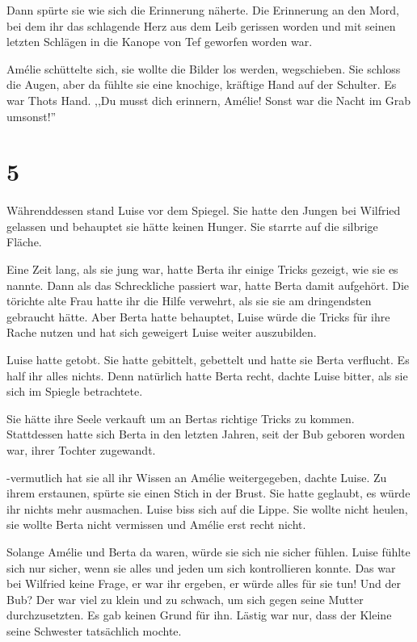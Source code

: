Dann spürte sie wie sich die Erinnerung näherte. Die Erinnerung an den Mord, bei dem ihr das schlagende Herz aus dem Leib gerissen worden und mit seinen letzten Schlägen in die Kanope von Tef geworfen worden war.

Amélie schüttelte sich, sie wollte die Bilder los werden, wegschieben. Sie schloss die Augen, aber da fühlte sie eine knochige, kräftige Hand auf der Schulter. Es war Thots Hand. ,,Du musst dich erinnern, Amélie! Sonst war die Nacht im Grab umsonst!''

\section*{5}

Währenddessen stand Luise vor dem Spiegel. Sie hatte den Jungen bei Wilfried gelassen und behauptet sie hätte keinen Hunger. Sie starrte auf die silbrige Fläche.

Eine Zeit lang, als sie jung war, hatte Berta ihr einige Tricks gezeigt, wie sie es nannte. Dann als das Schreckliche passiert war, hatte Berta damit aufgehört. Die törichte alte Frau hatte ihr die Hilfe verwehrt, als sie sie am dringendsten gebraucht hätte. Aber Berta hatte behauptet, Luise würde die Tricks für ihre Rache nutzen und hat sich geweigert Luise weiter auszubilden.

Luise hatte getobt. Sie hatte gebittelt, gebettelt und hatte sie Berta verflucht. Es half ihr alles nichts. Denn natürlich hatte Berta recht, dachte Luise bitter, als sie sich im Spiegle betrachtete.

Sie hätte ihre Seele verkauft um an Bertas richtige Tricks zu kommen. Stattdessen hatte sich Berta in den letzten Jahren, seit der Bub geboren worden war, ihrer Tochter zugewandt. 

-vermutlich hat sie all ihr Wissen an Amélie weitergegeben, dachte Luise. Zu ihrem erstaunen, spürte sie einen Stich in der Brust. Sie hatte geglaubt, es würde ihr nichts mehr ausmachen. Luise biss sich auf die Lippe. Sie wollte nicht heulen, sie wollte Berta nicht vermissen und Amélie erst recht nicht.

Solange Amélie und Berta da waren, würde sie sich nie sicher fühlen. Luise fühlte sich nur sicher, wenn sie alles und jeden um sich kontrollieren konnte. Das war bei Wilfried keine Frage, er war ihr ergeben, er würde alles für sie tun! Und der Bub? Der war viel zu klein und zu schwach, um sich gegen seine Mutter durchzusetzten. Es gab keinen Grund für ihn. Lästig war nur, dass der Kleine seine Schwester tatsächlich mochte.


